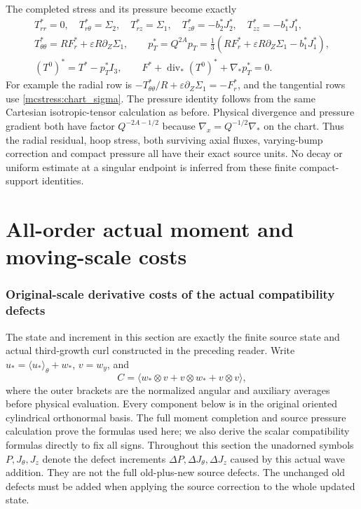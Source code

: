 \documentclass[11pt]{article}
\begin{document}
The completed stress and its pressure become exactly
\begin{equation}\label{mcstress:chart_tensor}
\begin{gathered}
 T^*_{rr}=0,\quad T^*_{r\theta}=\Sigma_2,\quad
 T^*_{rz}=\Sigma_1,\quad T^*_{z\theta}=-b_2^*J_2^*,\quad
 T^*_{zz}=-b_1^*J_1^*,\\
 T^*_{\theta\theta}=RF_r^*+\varepsilon R\partial_Z\Sigma_1,
 \qquad
 p_T^*=Q^{2A}p_T
  =\tfrac13(RF_r^*+\varepsilon R\partial_Z\Sigma_1-b_1^*J_1^*),\\
 (T^0)^*=T^*-p_T^*I_3,\qquad
 F^*+\operatorname{div}_*(T^0)^*+\nabla_*p_T^*=0.
\end{gathered}
\end{equation}
For example the radial row is
$-T^*_{\theta\theta}/R+\varepsilon\partial_Z\Sigma_1=-F_r^*$,
and the tangential rows use \eqref{mcstress:chart_sigma}. The pressure
identity follows from the same Cartesian isotropic-tensor calculation
as before. Physical divergence and pressure gradient both have factor
$Q^{-2A-1/2}$ because $\nabla_x=Q^{-1/2}\nabla_*$ on the chart.
Thus the radial residual, hoop stress, both surviving axial fluxes,
varying-bump correction and compact pressure all have their exact
source units. No decay or uniform estimate at a singular endpoint is
inferred from these finite compact-support identities.

\clearpage\part{All-order actual moment and moving-scale costs}
\section{Original-scale derivative costs of the actual compatibility defects}
\label{mcq:section}

The state and increment in this section are exactly the finite source state
and actual third-growth curl constructed in the preceding reader.
Write \(u_*=\langle u_*\rangle_\theta+w_*\), \(v=w_y\), and
\[
 C=\langle w_*\otimes v+v\otimes w_*+v\otimes v\rangle,
\]
where the outer brackets are the normalized angular and auxiliary
averages before physical evaluation. Every component below is in the
original oriented cylindrical orthonormal basis. The full moment
completion and source pressure calculation prove the formulas used here;
we also derive the scalar compatibility formulas directly to fix all signs.
Throughout this section the unadorned symbols \(P,J_\theta,J_z\)
denote the defect increments \(\Delta P,\Delta J_\theta,\Delta J_z\)
caused by this actual wave addition. They are not the full old-plus-new
source defects. The unchanged old defects must be added when applying
the source correction to the whole updated state.
\end{document}
